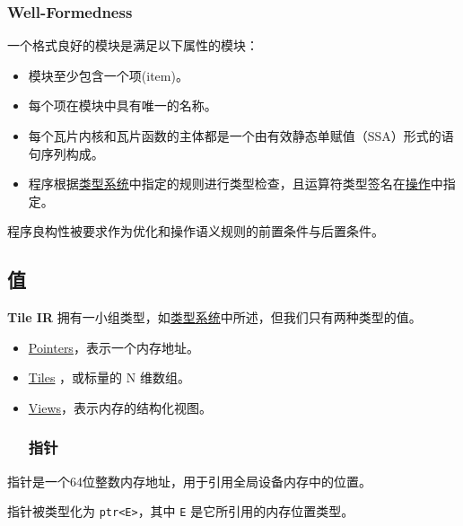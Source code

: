 \documentclass{article}
\begin{document}
\subsubsection{Well-Formedness}

一个格式良好的模块是满足以下属性的模块：


\begin{itemize}
\item 模块至少包含一个项(item)。
\item 每个项在模块中具有唯一的名称。
\item 每个瓦片内核和瓦片函数的主体都是一个由有效静态单赋值（SSA）形式的语句序列构成。
\item 程序根据\href{https://docs.nvidia.com/cuda/tile-ir/latest/sections/types.html#section-types}{类型系统}中指定的规则进行类型检查，且运算符类型签名在\href{https://docs.nvidia.com/cuda/tile-ir/latest/sections/operations.html#section-operations}{操作}中指定。

\end{itemize}
程序良构性被要求作为优化和操作语义规则的前置条件与后置条件。



\subsection{值}

\textbf{Tile IR} 拥有一小组类型，如\href{https://docs.nvidia.com/cuda/tile-ir/latest/sections/types.html#section-types}{类型系统}中所述，但我们只有两种类型的值。


\begin{itemize}
\item \href{https://docs.nvidia.com/cuda/tile-ir/latest/sections/types.html#type-ptr}{Pointers}，表示一个内存地址。
\item \href{https://docs.nvidia.com/cuda/tile-ir/latest/sections/types.html#type-tile}{Tiles} ，或标量的 N 维数组。
\item \href{https://docs.nvidia.com/cuda/tile-ir/latest/sections/types.html#type-views}{Views}，表示内存的结构化视图。

\subsubsection{指针}

\end{itemize}
指针是一个64位整数内存地址，用于引用全局设备内存中的位置。

指针被类型化为 \texttt{ptr<E>}，其中 \texttt{E} 是它所引用的内存位置类型。
\end{document}
